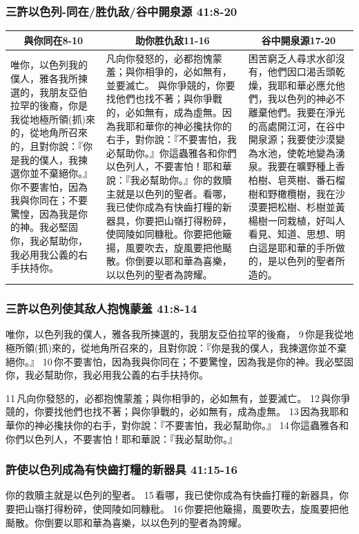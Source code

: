 \subsubsection{三許以色列-同在/胜仇敌/谷中開泉源 41:8-20}
\begin{table}[H]
\centering
\begin{tabular}{p{4.25cm}|p{7.0cm}|p{5.50cm}}\hline\hline
\multicolumn{1}{c|}{與你同在8-10}&\multicolumn{1}{c|}{助你胜仇敌11-16}&\multicolumn{1}{c}{谷中開泉源17-20}\\\hline
唯你，以色列我的僕人，雅各我所揀選的，我朋友亞伯拉罕的後裔，你是我從地極所領(抓)來的，從地角所召來的，且對你說：『你是我的僕人，我揀選你並不棄絕你。』你不要害怕，因為我與你同在；不要驚惶，因為我是你的神。我必堅固你，我必幫助你，我必用我公義的右手扶持你。
&凡向你發怒的，必都抱愧蒙羞；與你相爭的，必如無有，並要滅亡。 與你爭競的，你要找他們也找不著；與你爭戰的，必如無有，成為虛無。因為我耶和華你的神必攙扶你的右手，對你說：『不要害怕，我必幫助你。』你這蟲雅各和你們以色列人，不要害怕！耶和華說：『我必幫助你。』你的救贖主就是以色列的聖者。看哪，我已使你成為有快齒打糧的新器具，你要把山嶺打得粉碎，使岡陵如同糠秕。你要把他簸揚，風要吹去，旋風要把他颳散。你倒要以耶和華為喜樂，以以色列的聖者為誇耀。
&困苦窮乏人尋求水卻沒有，他們因口渴舌頭乾燥，我耶和華必應允他們，我以色列的神必不離棄他們。我要在淨光的高處開江河，在谷中開泉源；我要使沙漠變為水池，使乾地變為湧泉。我要在曠野種上香柏樹、皂莢樹、番石榴樹和野橄欖樹，我在沙漠要把松樹、杉樹並黃楊樹一同栽植，好叫人看見、知道、思想、明白這是耶和華的手所做的，是以色列的聖者所造的。
\\\hline
\end{tabular}
\end{table}

\iffalse
\subsubsection{三許以色列使其敌人抱愧蒙羞 41:8-14}
唯你，以色列我的僕人，雅各我所揀選的，我朋友亞伯拉罕的後裔， 9 你是我從地極所領(抓)來的，從地角所召來的，且對你說：『你是我的僕人，我揀選你並不棄絕你。』 10 你不要害怕，因為我與你同在；不要驚惶，因為我是你的神。我必堅固你，我必幫助你，我必用我公義的右手扶持你。 

11 凡向你發怒的，必都抱愧蒙羞；與你相爭的，必如無有，並要滅亡。 12 與你爭競的，你要找他們也找不著；與你爭戰的，必如無有，成為虛無。 13 因為我耶和華你的神必攙扶你的右手，對你說：『不要害怕，我必幫助你。』 14 你這蟲雅各和你們以色列人，不要害怕！耶和華說：『我必幫助你。』

\subsubsection{許使以色列成為有快齒打糧的新器具 41:15-16}
你的救贖主就是以色列的聖者。 15 看哪，我已使你成為有快齒打糧的新器具，你要把山嶺打得粉碎，使岡陵如同糠秕。 16 你要把他簸揚，風要吹去，旋風要把他颳散。你倒要以耶和華為喜樂，以以色列的聖者為誇耀。

